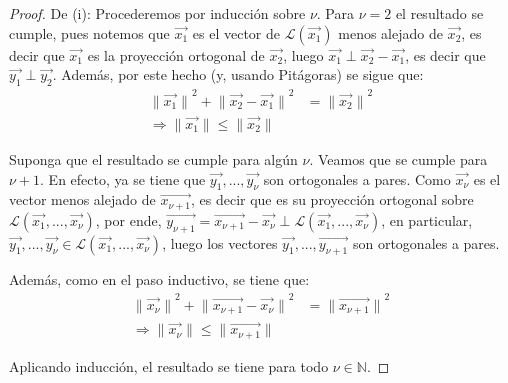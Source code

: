 \documentclass[12pt]{report}
\theoremstyle{largebreak}
\newcommand\norm[1]{\ensuremath{\|#1\|}}
\begin{document}
    \begin{proof}
        De (i): Procederemos por inducción sobre $\nu$. Para $\nu=2$ el resultado se cumple, pues notemos que $\vec{x_1}$ es el vector de $\mathcal{L}(\vec{x_1})$ menos alejado de $\vec{x_{2}}$, es decir que $\vec{x_1}$ es la proyección ortogonal de $\vec{x_2}$, luego $\vec{x_1}\perp \vec{x_2}-\vec{x_1}$, es decir que $\vec{y_1}\perp\vec{y_2}$. Además, por este hecho (y, usando Pitágoras) se sigue que:
        \begin{equation*}
            \begin{split}
                \norm{\vec{x_1}}^2+\norm{\vec{x_2}-\vec{x_1}}^2&=\norm{\vec{x_2}}^2\\
                \Rightarrow \norm{\vec{x_1}}\leq\norm{\vec{x_2}}
            \end{split}
        \end{equation*}

        Suponga que el resultado se cumple para algún $\nu$. Veamos que se cumple para $\nu+1$. En efecto, ya se tiene que $\vec{y_1},...,\vec{y_\nu}$ son ortogonales a pares. Como $\vec{x_\nu}$ es el vector menos alejado de $\vec{x_{\nu+1}}$, es decir que es su proyección ortogonal sobre $\mathcal{L}(\vec{x_1},...,\vec{x_\nu})$, por ende, $\vec{y_{\nu+1}}=\vec{x_{\nu+1}}-\vec{x_\nu}\perp \mathcal{L}(\vec{x_1},...,\vec{x_\nu})$, en particular, $\vec{y_1},...,\vec{y_\nu}\in\mathcal{L}(\vec{x_1},...,\vec{x_\nu})$, luego los vectores $\vec{y_1},...,\vec{y_{\nu+1}}$ son ortogonales a pares.
        
        Además, como en el paso inductivo, se tiene que:
        \begin{equation*}
            \begin{split}
                \norm{\vec{x_{\nu}}}^2+\norm{\vec{x_{\nu+1}}-\vec{x_{\nu}}}^2&=\norm{\vec{x_{\nu+1}}}^2\\
                    \Rightarrow \norm{\vec{x_{\nu}}}\leq\norm{\vec{x_{\nu+1}}}
            \end{split}
        \end{equation*}
        
        Aplicando inducción, el resultado se tiene para todo $\nu\in\mathbb{N}$.


\end{proof}
\end{document}

